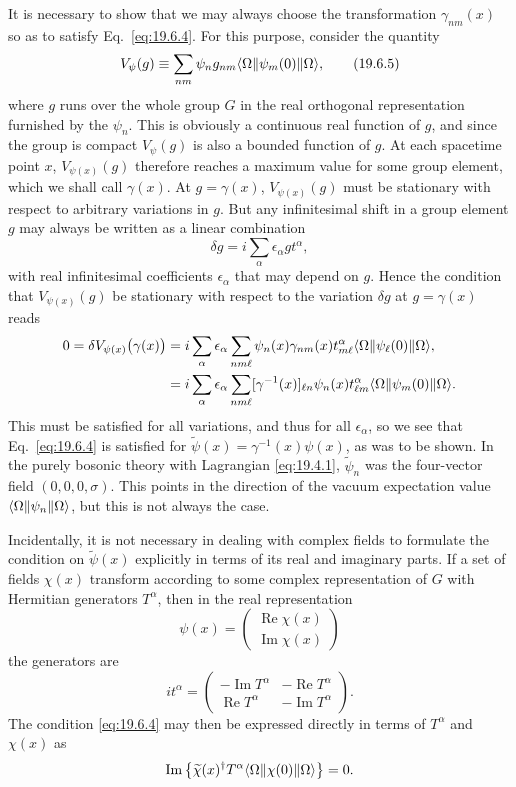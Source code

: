 It is necessary to show that we may always choose the transformation $\gamma_{nm}(x)$ so as to satisfy Eq.~\eqref{eq:19.6.4}. For this purpose, consider the quantity
\begin{equation}
V_\psi(g)\equiv
\sum_{nm}\psi_n g_{nm}\langle \Omega\rVert\psi_m(0)\lVert \Omega\rangle,
\tag{19.6.5}\label{eq:19.6.5}
\end{equation}
where $g$ runs over the whole group $G$ in the real orthogonal representation furnished by the $\psi_n$. This is obviously a continuous real function of $g$, and since the group is compact $V_\psi(g)$ is also a bounded function of $g$. At each spacetime point $x$, $V_{\psi(x)}(g)$ therefore reaches a maximum value for some group element, which we shall call $\gamma(x)$. At $g=\gamma(x)$, $V_{\psi(x)}(g)$ must be stationary with respect to arbitrary variations in $g$. But any infinitesimal shift in a group element $g$ may always be written as a linear combination
\[
\delta g=i\sum_\alpha\epsilon_\alpha g t^\alpha,
\]
with real infinitesimal coefficients $\epsilon_\alpha$ that may depend on $g$. Hence the condition that $V_{\psi(x)}(g)$ be stationary with respect to the variation $\delta g$ at $g=\gamma(x)$ reads
\[
\begin{aligned}
0=\delta V_{\psi(x)}\bigl(\gamma(x)\bigr)
&=i\sum_\alpha\epsilon_\alpha
\sum_{nm\ell}\psi_n(x)\gamma_{nm}(x)t^\alpha_{m\ell}
\langle \Omega\rVert\psi_\ell(0)\lVert \Omega\rangle,
\\
&=i\sum_\alpha\epsilon_\alpha
\sum_{nm\ell}[\gamma^{-1}(x)]_{\ell n}\psi_n(x)t^\alpha_{\ell m}
\langle \Omega\rVert\psi_m(0)\lVert \Omega\rangle.
\end{aligned}
\]
This must be satisfied for all variations, and thus for all $\epsilon_\alpha$, so we see that Eq.~\eqref{eq:19.6.4} is satisfied for $\widetilde\psi(x)=\gamma^{-1}(x)\psi(x)$, as was to be shown. In the purely bosonic theory with Lagrangian \eqref{eq:19.4.1}, $\widetilde\psi_n$ was the four-vector field $(0,0,0,\sigma)$. This points in the direction of the vacuum expectation value $\langle \Omega\rVert\psi_n\lVert \Omega\rangle$, but this is not always the case.

Incidentally, it is not necessary in dealing with complex fields to formulate the condition on $\widetilde\psi(x)$ explicitly in terms of its real and imaginary parts. If a set of fields $\chi(x)$ transform according to some complex representation of $G$ with Hermitian generators $T^\alpha$, then in the real representation
\[
\psi(x)=
\begin{pmatrix}
\operatorname{Re}\chi(x)\\
\operatorname{Im}\chi(x)
\end{pmatrix}
\]
the generators are
\[
it^\alpha=
\begin{pmatrix}
-\operatorname{Im}T^\alpha&-\operatorname{Re}T^\alpha\\
\operatorname{Re}T^\alpha&-\operatorname{Im}T^\alpha
\end{pmatrix}.
\]
The condition \eqref{eq:19.6.4} may then be expressed directly in terms of $T^\alpha$ and $\chi(x)$ as
\[
\operatorname{Im}\left\{
\widetilde\chi(x)^\dagger T^\alpha
\langle \Omega\rVert\chi(0)\lVert \Omega\rangle
\right\}=0.
\]


